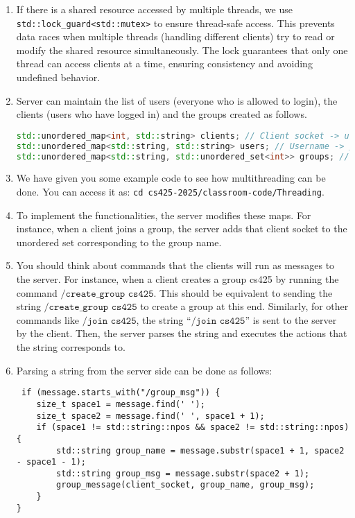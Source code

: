 \documentclass[12pt,a4paper]{article}
\begin{document}
\begin{enumerate}
\item If there is a shared resource accessed by multiple threads, we use \lstinline|std::lock_guard<std::mutex>| to ensure thread-safe access. This prevents data races when multiple threads (handling different clients) try to read or modify the shared resource simultaneously. The lock guarantees that only one thread can access clients at a time, ensuring consistency and avoiding undefined behavior.

\item  Server can maintain the list of users (everyone who is allowed to login), the clients (users who have logged in) and the groups created as follows. 
 \begin{lstlisting}[language=C++]
 std::unordered_map<int, std::string> clients; // Client socket -> username
std::unordered_map<std::string, std::string> users; // Username -> password
std::unordered_map<std::string, std::unordered_set<int>> groups; // Group -> client sockets
\end{lstlisting}
\item We have given you some example code to see how multithreading can be done. You can access it as: \texttt{cd cs425-2025/classroom-code/Threading}.
\item To implement the functionalities, the server modifies these maps. For instance, when a client joins a group, the server adds that client socket to the unordered set corresponding to the group name. 
\item You should think about commands that the clients will run as messages to the server. For instance, when a client creates a group cs425 by running the command $\texttt{/create\_group cs425}$. This should be equivalent to sending the string  $\texttt{/create\_group cs425}$ to create a group at this end. Similarly, for other commands like $\texttt{/join cs425}$, the string ``$\texttt{/join cs425}$'' is sent to the server by the client. Then, the server parses the string and executes the actions that the string corresponds to. 
\item Parsing a string from the server side can be done as follows:
\begin{lstlisting} 
 if (message.starts_with("/group_msg")) {
    size_t space1 = message.find(' ');
    size_t space2 = message.find(' ', space1 + 1);
    if (space1 != std::string::npos && space2 != std::string::npos) {
        std::string group_name = message.substr(space1 + 1, space2 - space1 - 1);
        std::string group_msg = message.substr(space2 + 1);
        group_message(client_socket, group_name, group_msg);
    }
}
\end{lstlisting}
\end{enumerate}
\end{document}
